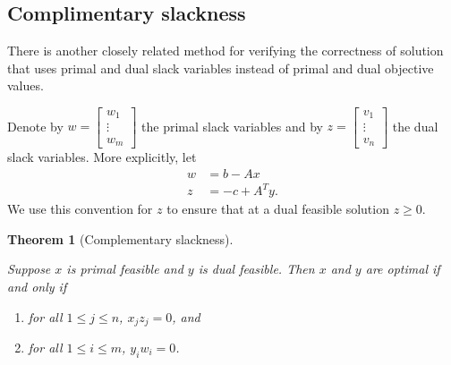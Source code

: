 \documentclass[
]{book}
\providecommand{\tightlist}{%
  \setlength{\itemsep}{0pt}\setlength{\parskip}{0pt}}
\newtheorem{theorem}{Theorem}[chapter]
\theoremstyle{definition}
\theoremstyle{definition}
\theoremstyle{definition}
\theoremstyle{definition}
\theoremstyle{remark}
\begin{document}
\hypertarget{complimentary-slackness}{%
\subsection{Complimentary slackness}\label{complimentary-slackness}}

There is another closely related method for verifying the correctness of solution that uses primal
and dual slack variables instead of primal and dual objective values.

Denote by \(w = \begin{bmatrix} w_1 \\ \vdots \\ w_m \end{bmatrix}\) the primal slack variables and by
\(z = \begin{bmatrix} v_1 \\ \vdots \\ v_n \end{bmatrix}\) the dual slack variables.
More explicitly, let
\begin{align*}
  w &= b - A x \\ 
  z &= -c + A^T y.  
\end{align*}
We use this convention for \(z\) to ensure that at a dual feasible solution \(z \ge 0\).

\begin{theorem}[Complementary slackness]
\protect\hypertarget{thm:complementary-slackness}{}\label{thm:complementary-slackness}

Suppose \(x\) is primal feasible and \(y\) is dual feasible. Then \(x\) and \(y\) are optimal if and only if

\begin{enumerate}
\def\labelenumi{\arabic{enumi}.}
\tightlist
\item
  for all \(1 \le j \le n\), \(x_j z_j = 0\), and
\item
  for all \(1 \le i \le m\), \(y_i w_i = 0\).
\end{enumerate}

\end{theorem}
\end{document}

